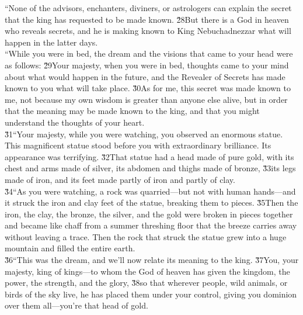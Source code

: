\begin{poetry}
\poeml ``None of the advisors, enchanters, diviners, or astrologers can explain the secret that the king has requested to be made known. \v{28}But there is a God in heaven who reveals secrets, and he is making known to King Nebuchadnezzar what will happen in the latter days. \\
\poeml ``While you were in bed, the dream and the visions that came to your head were as follows: \v{29}Your majesty, when you were in bed, thoughts came to your mind about what would happen in the future, and the Revealer of Secrets has made known to you what will take place. \v{30}As for me, this secret was made known to me, not because my own wisdom is greater than anyone else alive, but in order that the meaning may be made known to the king, and that you might understand the thoughts of your heart. \\
\poeml \v{31}``Your majesty, while you were watching, you observed an enormous statue. This magnificent statue stood before you with extraordinary brilliance. Its appearance was terrifying. \v{32}That statue had a head made of pure gold, with its chest and arms made of silver, its abdomen and thighs made of bronze, \v{33}its legs made of iron, and its feet made partly of iron and partly of clay. \\
\poeml \v{34}``As you were watching, a rock was quarried---but not with human hands---and it struck the iron and clay feet of the statue, breaking them to pieces. \v{35}Then the iron, the clay, the bronze, the silver, and the gold were broken in pieces together and became like chaff from a summer threshing floor that the breeze carries away without leaving a trace. Then the rock that struck the statue grew into a huge mountain and filled the entire earth. \\
\poeml \v{36}``This was the dream, and we'll now relate its meaning to the king. \v{37}You, your majesty, king of kings---to whom the God of heaven has given the kingdom, the power, the strength, and the glory, \v{38}so that wherever people, wild animals, or birds of the sky live, he has placed them under your control, giving you dominion over them all---you're that head of gold. \\

\end{poetry}
